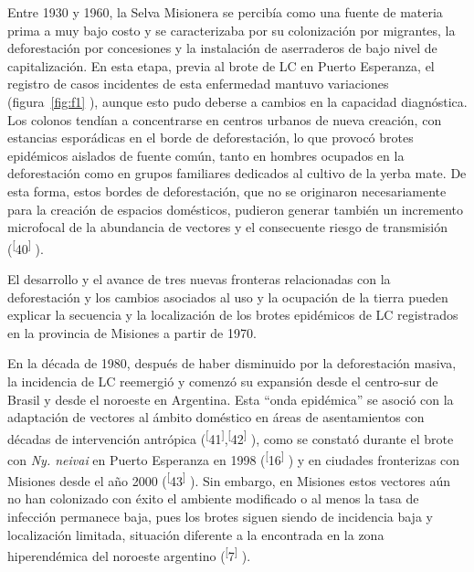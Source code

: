 \documentclass{article}
\begin{document}
Entre 1930 y 1960, la Selva Misionera se percibía como una fuente de materia
prima a muy bajo costo y se caracterizaba por su colonización por migrantes, la
deforestación por concesiones y la instalación de aserraderos de bajo nivel de
capitalización. En esta etapa, previa al brote de LC en Puerto Esperanza, el
registro de casos incidentes de esta enfermedad mantuvo variaciones (figura~\ref{fig:f1}
), aunque esto pudo deberse a cambios en la capacidad diagnóstica. Los colonos
tendían a concentrarse en centros urbanos de nueva creación, con estancias
esporádicas en el borde de deforestación, lo que provocó brotes epidémicos
aislados de fuente común, tanto en hombres ocupados en la deforestación como en
grupos familiares dedicados al cultivo de la yerba mate. De esta forma, estos
bordes de deforestación, que no se originaron necesariamente para la creación de
espacios domésticos, pudieron generar también un incremento microfocal de la
abundancia de vectores y el consecuente riesgo de transmisión
(\textsuperscript{[}40\textsuperscript{]}
).

El desarrollo y el avance de tres nuevas fronteras relacionadas con la
deforestación y los cambios asociados al uso y la ocupación de la tierra pueden
explicar la secuencia y la localización de los brotes epidémicos de LC
registrados en la provincia de Misiones a partir de 1970.

En la década de 1980, después de haber disminuido por la deforestación masiva,
la incidencia de LC reemergió y comenzó su expansión desde el centro-sur de
Brasil y desde el noroeste en Argentina. Esta “onda epidémica” se asoció con la
adaptación de vectores al ámbito doméstico en áreas de asentamientos con décadas
de intervención antrópica (\textsuperscript{[}41\textsuperscript{]},\textsuperscript{[}42\textsuperscript{]}
), como se constató durante el brote con \textit{Ny. neivai}
en Puerto Esperanza en 1998 (\textsuperscript{[}16\textsuperscript{]}
) y en ciudades fronterizas con Misiones desde el año 2000
(\textsuperscript{[}43\textsuperscript{]}
). Sin embargo, en Misiones estos vectores aún no han colonizado con éxito el
ambiente modificado o al menos la tasa de infección permanece baja, pues los
brotes siguen siendo de incidencia baja y localización limitada, situación
diferente a la encontrada en la zona hiperendémica del noroeste argentino
(\textsuperscript{[}7\textsuperscript{]}
).
\end{document}
